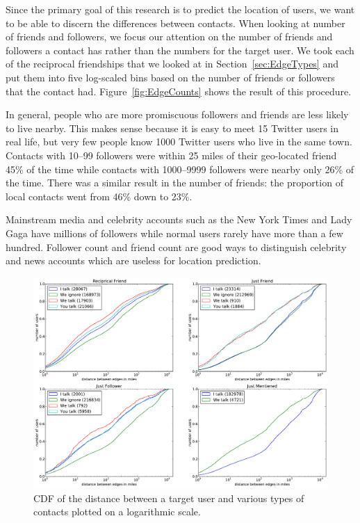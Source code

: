 \documentclass[letterpaper]{article}
\begin{document}
Since the primary goal of this research is to predict the location of users, we
want to be able to discern the differences between contacts.
%
When looking at number of friends and followers, we focus our attention on the
number of friends and followers a contact has rather than the numbers for the
target user.
%
We took each of the reciprocal friendships that we looked at in
Section~\ref{sec:EdgeTypes} and put them into five log-scaled bins based on
the number of friends or followers that the contact had.
%
Figure~\ref{fig:EdgeCounts} shows the result of this procedure.

In general, people who are more promiscuous followers and friends are less
likely to live nearby.
%
This makes sense because it is easy to meet 15 Twitter users in real life, but
very few people know 1000 Twitter users who live in the same town.
%
Contacts with 10--99 followers were within 25 miles of their geo-located friend
45\% of the time while contacts with 1000--9999 followers were nearby only 26\%
of the time.
%
There was a similar result in the number of friends: the proportion of local
contacts went from 46\% down to 23\%.

Mainstream media and celebrity accounts such as the New York Times and Lady
Gaga have millions of followers while normal users rarely have more than a few
hundred.
%
Follower count and friend count are good ways to distinguish celebrity and news
accounts which are useless for location prediction.

\ifdefined\THESIS
    \begin{figure}[tbh]
    \centering
    \includegraphics[width=\linewidth]{figures/com_types.pdf}
    \caption{
    CDF of the distance between a target user and various types of contacts
    plotted on a logarithmic scale.
    }
    \label{fig:ComTypes}
    \end{figure}
\fi
\end{document}
